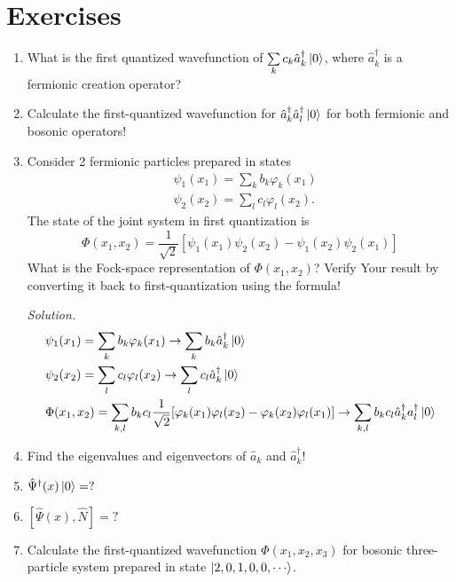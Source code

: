 \documentclass[11pt, a4paper]{article}
\begin{document}
\section{Exercises}
\begin{enumerate}
    \item What is the first quantized wavefunction of $\sum\limits_k c_k \hat a_k^{\dagger}\ket 0$, where
    $\hat a_k^{\dagger}$ is a fermionic creation operator?
    \item Calculate the first-quantized wavefunction for $\hat a_k^{\dagger}\hat a_l^{\dagger}\ket 0$ for
    both fermionic and bosonic operators!
    \item Consider 2 fermionic particles prepared in states
    \begin{align*}
        &\psi_1(x_1) = \sum\limits_k b_k\varphi_k(x_1)\\
        &\psi_2(x_2) = \sum\limits_l c_l\varphi_l(x_2).
    \end{align*}
    The state of the joint system in first quantization is 
    \begin{equation*}
        \Phi(x_1, x_2) = \frac{1}{\sqrt 2}[\psi_1(x_1)\psi_2(x_2) - \psi_1(x_2)\psi_2(x_1)]
    \end{equation*}
    What is the Fock-space representation of $\Phi(x_1, x_2)$? Verify Your result by converting it back to 
    first-quantization using the formula!
    \par \textit{Solution.} 
    \begin{align*}
        &\psi_1(x_1) = \sum\limits_k b_k\varphi_k(x_1) \rightarrow \sum\limits_k b_k \hat a_k^{\dagger}\ket{0} \\
        &\psi_2(x_2) = \sum\limits_l c_l\varphi_l(x_2) \rightarrow \sum\limits_l c_l \hat a_k^{\dagger}\ket{0} \\
        &\Phi(x_1, x_2) = \sum\limits_{k,l} b_kc_l \frac{1}{\sqrt 2} [\varphi_k(x_1)\varphi_l(x_2) - \varphi_k(x_2)\varphi_l(x_1)]
        \rightarrow \sum\limits_{k,l} b_kc_l \hat a_k^{\dagger}a_l^{\dagger} \ket 0 
    \end{align*}
    \item Find the eigenvalues and eigenvectors of $\hat a_k$ and $\hat a_k^{\dagger}$!
    \item $\hat\Psi^{\dagger}(x)\ket 0 = ?$
    \item $[\hat\Psi(x), \hat N] = ?$
    \item Calculate the first-quantized wavefunction $\Phi(x_1,x_2,x_3)$ for bosonic three-particle system 
    prepared in state $\ket{2, 0, 1, 0, 0, \cdots}$.

\end{enumerate}
\end{document}
